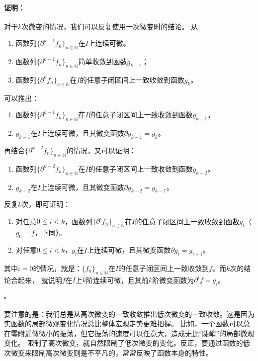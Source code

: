 \documentclass[12pt,UTF8]{ctexbook}
\theoremstyle{definition}
\theoremstyle{plain}
\renewenvironment{proof}{\paragraph{\textbf{证明：}}}{\hfill$\square$}
\begin{document}
\begin{appendix}
\begin{proof}
    对于$k$次微变的情况，我们可以反复使用一次微变时的结论。
    从
    \begin{enumerate}
        \item 函数列$\{\partial^{k-1} f_n\}_{n\in\mathbb{N}}$在$I$上连续可微。
        \item 函数列$\{\partial^{k-1} f_n\}_{n\in\mathbb{N}}$简单收敛到函数$g_{k-1}$；
        \item 函数列$\{\partial^k f_n\}_{n\in\mathbb{N}}$在$I$的任意子闭区间上一致收敛到函数$g_k$。
    \end{enumerate}
    可以推出：
    \begin{enumerate}
        \item 函数列$\{\partial^{k-1} f_n\}_{n\in\mathbb{N}}$在$I$的任意子闭区间上一致收敛到函数$g_{k-1}$。
        \item $g_{k-1}$在$I$上连续可微，且其微变函数$\partial g_{k-1} = g_k$。
    \end{enumerate}
    再结合$\{\partial^{k-2} f_n\}_{n\in\mathbb{N}}$的情况，又可以证明：
    \begin{enumerate}
        \item 函数列$\{\partial^{k-2} f_n\}_{n\in\mathbb{N}}$在$I$的任意子闭区间上一致收敛到函数$g_{k-2}$。
        \item $g_{k-2}$在$I$上连续可微，且其微变函数$\partial g_{k-2} = g_{k-1}$。
    \end{enumerate}
    反复$k$次，即可证明：
    \begin{enumerate}
        \item 对任意$0\leqslant i < k$，函数列$\{\partial^{i} f_n\}_{n\in\mathbb{N}}$在$I$的任意子闭区间上一致收敛到函数$g_{i}$（$g_0 = f$，下同）。
        \item 对任意$0\leqslant i < k$，$g_{i}$在$I$上连续可微，且其微变函数$\partial g_{i} = g_{i+1}$。
    \end{enumerate}
    其中$i = 0$的情况，就是：$\{f_n\}_{n\in\mathbb{N}}$在$I$的任意子闭区间上一致收敛到$f$。而$k$次的结论合起来，
    就说明$f$在$I$上$k$阶连续可微，且其前$k$阶微变函数为$\partial^i f = g_i$。

\end{proof}

要注意的是：我们总是从高次微变的一致收敛推出低次微变的一致收敛。这是因为实函数的局部微观变化情况总比整体宏观走势更难把握。
比如，一个函数可以总在零附近做微小的振荡，但它振荡的速度可以任意大，造成无比“陡峭”的局部微观变化。
限制了高次微变，就自然限制了低次微变的变化。反正，要通过函数的低次微变来限制高次微变则是不平凡的，常常反映了函数本身的特性。


\end{appendix}
\end{document}
